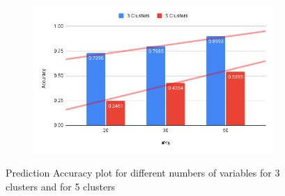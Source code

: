 \documentclass{article}
\begin{document}
\begin{figure}[htbp!]
  \centering
  \begin{subfigure}{0.8\textwidth}
      \centering
      \includegraphics[width=\textwidth]{images/experiments/3_vs_5_clusters}
  \end{subfigure}
  \caption{Prediction Accuracy plot for different numbers of variables for 3 clusters and for 5 clusters}
  \label{fig:3vs5}
\end{figure}
\end{document}
